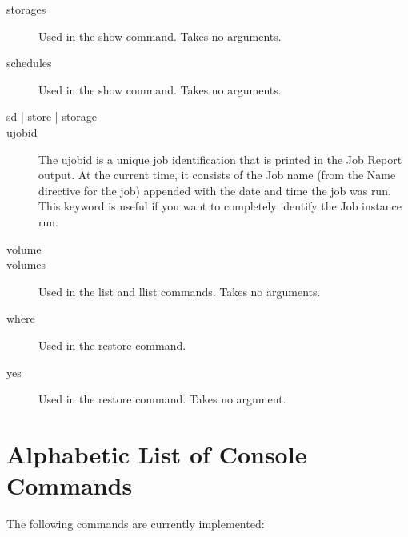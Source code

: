 \begin{description}
\item [storages]
  Used in the show command. Takes no arguments.
\item [schedules]
  Used in the show command. Takes no arguments.
\item [sd | store | storage]
\item [ujobid]
  The ujobid is a unique job identification that is printed
  in the Job Report output. At the current time, it consists
  of the Job name (from the Name directive for the job) appended
  with the date and time the job was run. This keyword is useful
  if you want to completely identify the Job instance run.
\item [volume]
\item [volumes]
  Used in the list and llist commands. Takes no arguments.
\item [where]
  Used in the restore command.
\item [yes]
  Used in the restore command. Takes no argument.
\end{description}

\section{Alphabetic List of Console Commands}

The following commands are currently implemented:


